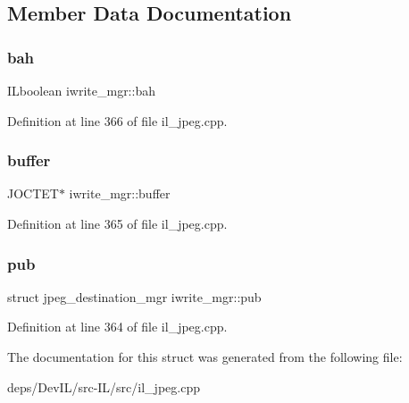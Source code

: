 \subsection{Member Data Documentation}
\mbox{\label{structiwrite__mgr_ae25c39c77e98c1bd1ca14156e439b6f4}} 
\subsubsection{\texorpdfstring{bah}{bah}}
{\footnotesize\ttfamily I\+Lboolean iwrite\+\_\+mgr\+::bah}



Definition at line 366 of file il\+\_\+jpeg.\+cpp.

\mbox{\label{structiwrite__mgr_a6bd5e198c01f2c2c05da94046721cb5c}} 
\subsubsection{\texorpdfstring{buffer}{buffer}}
{\footnotesize\ttfamily J\+O\+C\+T\+ET$\ast$ iwrite\+\_\+mgr\+::buffer}



Definition at line 365 of file il\+\_\+jpeg.\+cpp.

\mbox{\label{structiwrite__mgr_ae1c8c4aabc6ca6fc612e23ab1a89d6f8}} 
\subsubsection{\texorpdfstring{pub}{pub}}
{\footnotesize\ttfamily struct jpeg\+\_\+destination\+\_\+mgr iwrite\+\_\+mgr\+::pub}



Definition at line 364 of file il\+\_\+jpeg.\+cpp.



The documentation for this struct was generated from the following file\+:\begin{DoxyCompactItemize}
\item 
deps/\+Dev\+I\+L/src-\/\+I\+L/src/il\+\_\+jpeg.\+cpp\end{DoxyCompactItemize}

